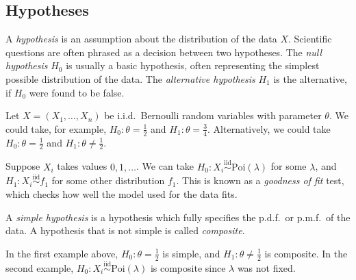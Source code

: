 \subsection{Hypotheses}
\begin{definition}
	A \textit{hypothesis} is an assumption about the distribution of the data \( X \).
	Scientific questions are often phrased as a decision between two hypotheses.
	The \textit{null hypothesis} \( H_0 \) is usually a basic hypothesis, often representing the simplest possible distribution of the data.
	The \textit{alternative hypothesis} \( H_1 \) is the alternative, if \( H_0 \) were found to be false.
\end{definition}
\begin{example}
	Let \( X = (X_1, \dots, X_n) \) be i.i.d.\ Bernoulli random variables with parameter \( \theta \).
	We could take, for example, \( H_0 \colon \theta = \frac{1}{2} \) and \( H_1 \colon \theta = \frac{3}{4} \).
	Alternatively, we could take \( H_0 \colon \theta = \frac{1}{2} \) and \( H_1 \colon \theta \neq \frac{1}{2} \).
\end{example}
\begin{example}
	Suppose \( X_i \) takes values \( 0, 1, \dots \).
	We can take \( H_0 \colon X_i \overset{\mathrm{iid}}{\sim} \mathrm{Poi}(\lambda) \) for some \( \lambda \), and \( H_1 \colon X_i \overset{\mathrm{iid}}{\sim} f_1 \) for some other distribution \( f_1 \).
	This is known as a \textit{goodness of fit} test, which checks how well the model used for the data fits.
\end{example}
\begin{definition}
	A \textit{simple hypothesis} is a hypothesis which fully specifies the p.d.f.\ or p.m.f.\ of the data.
	A hypothesis that is not simple is called \textit{composite}.
\end{definition}
\begin{example}
	In the first example above, \( H_0 \colon \theta = \frac{1}{2} \) is simple, and \( H_1 \colon \theta \neq \frac{1}{2} \) is composite.
	In the second example, \( H_0 \colon X_i \overset{\mathrm{iid}}{\sim} \mathrm{Poi}(\lambda) \) is composite since \( \lambda \) was not fixed.
\end{example}

